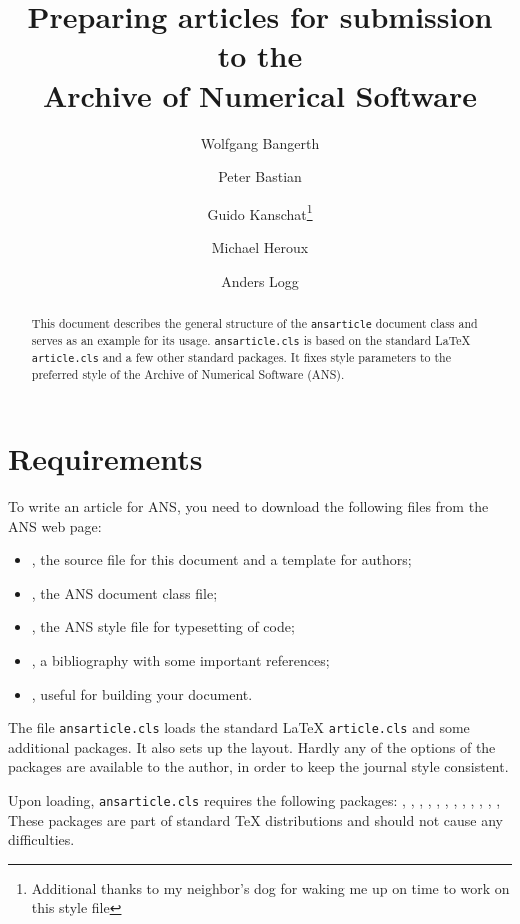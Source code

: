 \documentclass{ansarticle}
\title{Preparing articles for submission to the \\
       Archive of Numerical Software}
\author[1]{Wolfgang Bangerth}
\author[2]{Peter Bastian}
\author[1]{Guido Kanschat\thanks{Additional thanks to my neighbor's dog
  for waking me up on time to work on this style file}}
\author[3]{Michael Heroux}
\author[4]{Anders Logg}
\affil[1]{Department of Mathematics, Texas A\&M University}
\affil[2]{IWR, Universit\"at Heidelberg}
\affil[3]{Sandia National Laboratories}
\affil[4]{Simula Research Laboratory}
\begin{document}
\maketitle

\begin{abstract}
  This document describes the general structure of the
  \texttt{ansarticle} document class and serves as an example for its
  usage. \texttt{ansarticle.cls} is based on the standard \LaTeX{}
  \texttt{article.cls} and a few other standard packages. It fixes
  style parameters to the preferred style of the Archive of Numerical
  Software (ANS).
\end{abstract}

\section{Requirements}

To write an article for ANS, you need to download the following files
from the ANS web page:
\begin{itemize}
\item
  , the source file for this document and a template for
  authors;
\item
  , the ANS document class file;
\item
  , the ANS style file for typesetting of code;
\item
  , a bibliography with some important
  references;
\item
  , useful for building your document.
\end{itemize}

The file \texttt{ansarticle.cls} loads the standard LaTeX
\texttt{article.cls} and some additional packages. It also sets up the
layout. Hardly any of the options of the packages are available to the
author, in order to keep the journal style consistent.

Upon loading, \texttt{ansarticle.cls} requires the following packages:
,
,
,
,
,
,
,
,
,
,
,
,
These packages are part of standard \TeX{} distributions and should
not cause any difficulties.

\end{document}
